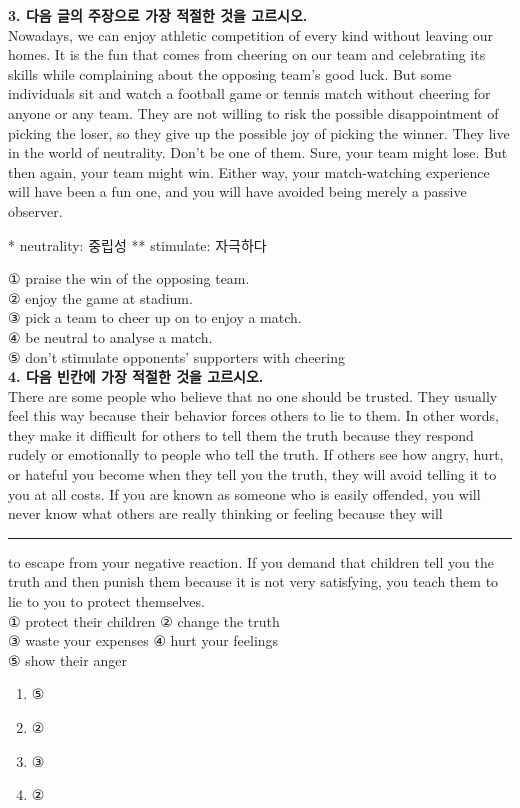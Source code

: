 \documentclass[a4paper, twocolumn]{oblivoir}
\begin{document}
\pagebreak
\noindent
\textbf{3. 다음 글의 주장으로 가장 적절한 것을 고르시오.}\\

Nowadays, we can enjoy athletic competition of every
kind without leaving our homes. It is the fun that comes
from cheering on our team and celebrating its skills
while complaining about the opposing team’s good luck.
But some individuals sit and watch a football game or
tennis match without cheering for anyone or any team.
They are not willing to risk the possible disappointment
of picking the loser, so they give up the possible joy of
picking the winner. They live in the world of neutrality.
Don’t be one of them. Sure, your team might lose. But
then again, your team might win. Either way, your
match-watching experience will have been a fun one, and you
will have avoided being merely a passive observer.
\begin{flushright}
    \small{* neutrality: 중립성 ** stimulate: 자극하다}
\end{flushright}

\noindent
① praise the win of the opposing team.\\
② enjoy the game at stadium.\\
③ pick a team to cheer up on to enjoy a match.\\
④ be neutral to analyse a match.\\
⑤ don't stimulate opponents' supporters with cheering\\


\noindent
\textbf{4. 다음 빈칸에 가장 적절한 것을 고르시오.}\\

There are some people who believe that no one should
be trusted. They usually feel this way because their
behavior forces others to lie to them. In other words,
they make it difficult for others to tell them the truth
because they respond rudely or emotionally to people who
tell the truth. If others see how angry, hurt, or hateful you
become when they tell you the truth, they will avoid telling
it to you at all costs. If you are known as someone who is
easily offended, you will never know what others are really
thinking or feeling because they will \rule{1.2cm}{0.15mm}
to escape from your negative reaction. If you demand that
children tell you the truth and then punish them because it
is not very satisfying, you teach them to lie to you to
protect themselves.\\

\noindent
① protect their children\hspace{1em} ② change the truth\\
③ waste your expenses \hspace{1em} ④ hurt your feelings\\
⑤ show their anger\\


\pagebreak

\begin{enumerate}
    \item ⑤
    \item ②
    \item ③
    \item ②
\end{enumerate}
\end{document}
